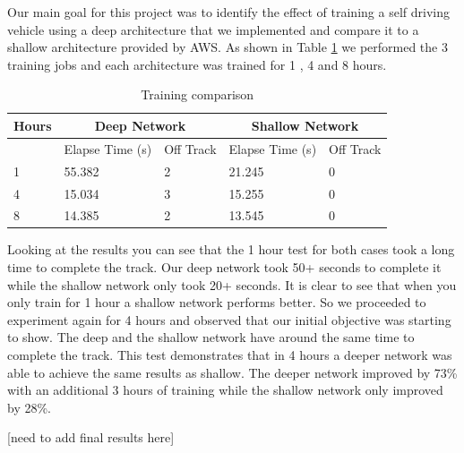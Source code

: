 \documentclass[journal]{IEEEtran}
\begin{document}
Our main goal for this project was to identify the effect of training a self driving vehicle using a deep architecture that we implemented and compare it to a shallow architecture provided by AWS.  As shown in Table \ref{mainTest} we performed the 3 training jobs and each architecture was trained for 1 , 4 and 8 hours. 

\begin{table}[t]
\centering
\caption{Training comparison}
\begin{tabular}{ |p{1cm}|p{1.5cm}|p{1cm}|p{1.5cm}|p{1cm}| }
\hline
 \multicolumn{1}{|c|}{Hours} & \multicolumn{2}{|c|}{Deep Network} & \multicolumn{2}{|c|}{Shallow Network} \\
\hline
 & Elapse Time (s) & Off Track &  Elapse Time (s) & Off Track  \\
\hline
\multirow{1}{4em}{1} & 55.382 & 2 & 21.245 & 0 \\ 
 \hline
\multirow{1}{4em}{4} & 15.034& 3 & 15.255 & 0 \\ 
 \hline
\multirow{1}{4em}{8} & 14.385 & 2 & 13.545 & 0 \\ 
 \hline
\end{tabular}
\label{mainTest}
\end{table}

Looking at the results you can see that the 1 hour test for both cases took a long time to complete the track.  Our deep network took 50+ seconds to complete it while the shallow network only took 20+ seconds.  It is clear to see that when you only train for 1 hour a shallow network performs better.  So we proceeded to experiment again for 4 hours and observed that our initial objective was starting to show.  The deep and the shallow network have around the same time to complete the track.  This test demonstrates that in 4 hours a deeper network was able to achieve the same results as shallow.  The deeper network improved by 73\% with an additional 3 hours of training while the shallow network only improved by 28\%.  

[need to add final results here]
\end{document}
